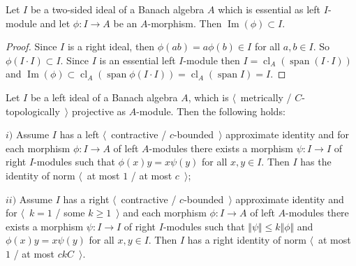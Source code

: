 \begin{lemma}\label{ImgOfAMorphFromBiIdToA} Let $I$ be a two-sided ideal of a Banach algebra $A$ which is essential as left $I$-module and let $\phi:I\to A$ be an $A$-morphism. Then $\operatorname{Im}(\phi)\subset I$.
\end{lemma}
\begin{proof} Since $I$ is a right ideal, then $\phi(ab)=a\phi(b)\in I$ for all $a,b\in I$. So $\phi(I\cdot I)\subset I$. Since $I$ is an essential left $I$-module then $I=\operatorname{cl}_A(\operatorname{span}(I\cdot I))$ and $\operatorname{Im}(\phi)\subset\operatorname{cl}_A(\operatorname{span}\phi(I\cdot I))=\operatorname{cl}_A(\operatorname{span}I)=I$.
\end{proof}

\begin{lemma}\label{GoodIdealMetTopProjIsUnital} Let $I$ be a left ideal of a Banach algebra $A$, which is $\langle$~metrically / $C$-topologically~$\rangle$ projective as $A$-module. Then the following holds:

$i)$ Assume $I$ has a left $\langle$~contractive / $c$-bounded~$\rangle$ approximate identity and for each  morphism $\phi:I\to A$ of left $A$-modules there exists a morphism $\psi:I\to I$ of right $I$-modules such that $\phi(x)y=x\psi(y)$ for all $x,y\in I$. Then $I$ has the identity of norm $\langle$~at most $1$ / at most $c$~$\rangle$;

$ii)$ Assume $I$ has a right $\langle$~contractive / $c$-bounded~$\rangle$ approximate identity and for $\langle$~$k=1$ / some $k\geq 1$~$\rangle$ and each morphism $\phi:I\to A$ of left $A$-modules there exists a morphism $\psi:I\to I$ of right $I$-modules such that $\Vert\psi\Vert\leq k\Vert\phi\Vert$ and $\phi(x)y=x\psi(y)$ for all $x,y\in I$. Then $I$ has a right identity of norm $\langle$~at most $1$ / at most $ckC$~$\rangle$.
\end{lemma} 
